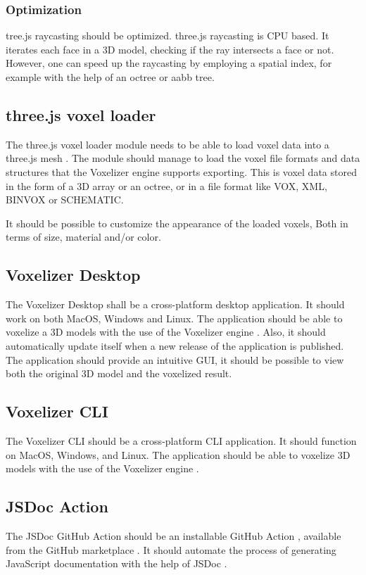 \subsubsection{Optimization}
tree.js raycasting should be optimized. three.js raycasting is CPU based. It iterates each face in a 3D model, checking if the ray intersects a face or not. However, one can speed up the raycasting by employing a spatial index, for example with the help of an octree \cite{octree} or aabb tree.

\subsection{three.js voxel loader}
The three.js voxel loader module needs to be able to load voxel data into a three.js mesh \cite{three.js-mesh}. The module should manage to load the voxel file formats and data structures that the Voxelizer engine supports exporting. This is voxel data stored in the form of a 3D array or an octree, or in a file format like VOX, XML, BINVOX or SCHEMATIC.

It should be possible to customize the appearance of the loaded voxels, Both in terms of size, material and/or color.

\subsection{Voxelizer Desktop}
The Voxelizer Desktop shall be a cross-platform \cite{cross-platform} desktop application. It should work on both MacOS, Windows and Linux. The application should be able to voxelize a 3D models with the use of the Voxelizer engine \cite{voxelizer}. Also, it should automatically update itself when a new release of the application is published. The application should provide an intuitive GUI, it should be possible to view both the original 3D model and the voxelized result.

\subsection{Voxelizer CLI}
The Voxelizer CLI should be a cross-platform \cite{cross-platform} CLI application. It should function on MacOS, Windows, and Linux. The application should be able to voxelize 3D models with the use of the Voxelizer engine \cite{voxelizer}.

\subsection{JSDoc Action}
The JSDoc GitHub Action should be an installable GitHub Action \cite{github-actions}, available from the GitHub marketplace \cite{github-marketplace}. It should automate the process of generating JavaScript documentation with the help of JSDoc \cite{jsdoc}.

